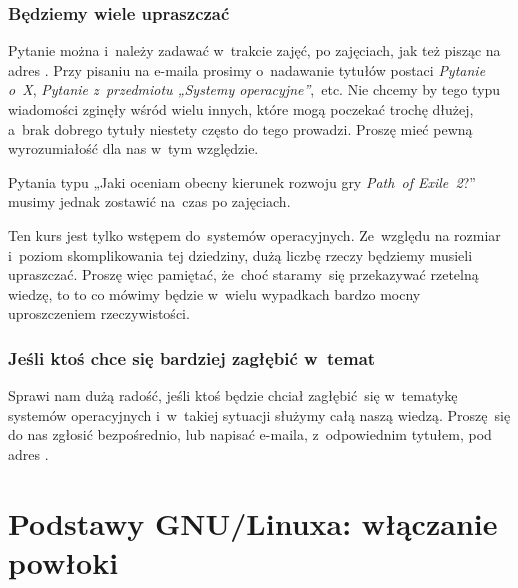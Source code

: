 \documentclass[10pt,t]{beamer}
\begin{document}
\begin{frame}
  \frametitle{Będziemy wiele upraszczać}


  Pytanie można i~\alert{należy} zadawać w~trakcie zajęć, po zajęciach, jak
  też pisząc na adres \email. Przy pisaniu na e-maila prosimy o~nadawanie
  tytułów postaci \textit{Pytanie o~X}, \textit{Pytanie z~przedmiotu
    „Systemy operacyjne”},~etc. Nie chcemy by tego typu wiadomości zginęły
  wśród wielu innych, które mogą poczekać trochę dłużej, a~brak dobrego
  tytuły niestety często do tego prowadzi. Proszę mieć pewną wyrozumiałość
  dla nas w~tym względzie.

  Pytania typu „Jaki oceniam obecny kierunek rozwoju gry \textit{Path~of
    Exile~2}?” musimy jednak zostawić na~czas po zajęciach.

  Ten kurs jest tylko \alert{wstępem} do~systemów operacyjnych. Ze~względu
  na rozmiar i~poziom skomplikowania tej dziedziny, dużą liczbę rzeczy
  będziemy musieli \alert{upraszczać}. Proszę więc pamiętać, że~choć
  staramy~się przekazywać rzetelną wiedzę, to to co mówimy będzie w~wielu
  wypadkach bardzo mocny \alert{uproszczeniem} rzeczywistości.


\end{frame}





\begin{frame}
  \frametitle{Jeśli ktoś chce się bardziej zagłębić w~temat}


  Sprawi nam dużą radość, jeśli ktoś będzie chciał zagłębić~się
  w~tematykę systemów operacyjnych i~w~takiej sytuacji służymy całą naszą
  wiedzą. Proszę~się do nas zgłosić bezpośrednio, lub napisać e-maila,
  z~odpowiednim tytułem, pod adres \email.

\end{frame}










\section{Podstawy GNU/Linuxa: włączanie powłoki}
\end{document}
